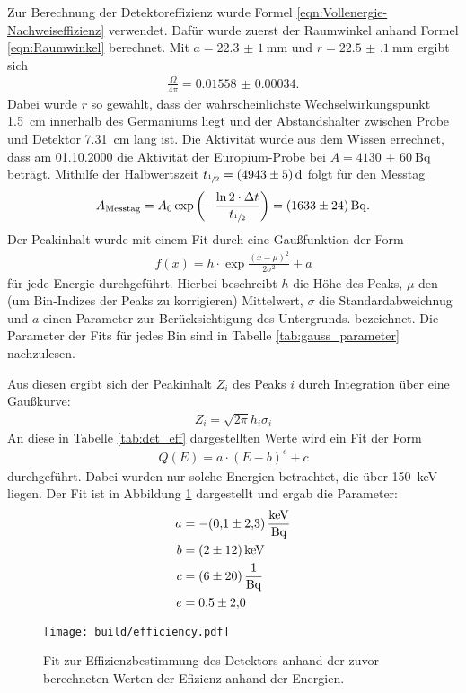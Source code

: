 Zur Berechnung der Detektoreffizienz wurde Formel
\eqref{eqn:Vollenergie-Nachweiseffizienz} verwendet. Dafür wurde zuerst der
Raumwinkel anhand Formel \eqref{eqn:Raumwinkel} berechnet. Mit
$a = \SI{22.3(10)}{\milli\meter}$ und $r = \SI{22.5(1)}{\milli\meter}$ ergibt sich
\begin{align*}
  \frac{\Omega}{4\pi} = \num{0.01558(34)}
	.
\end{align*}
Dabei wurde $r$ so gewählt, dass der wahrscheinlichste Wechselwirkungspunkt
\SI{1.5}{\centi\meter} innerhalb des Germaniums liegt und der Abstandshalter
zwischen Probe und Detektor \SI{7.31}{\centi\meter} lang ist.
Die Aktivität wurde aus dem Wissen errechnet, dass am 01.10.2000 die Aktivität
der Europium-Probe bei $A = \SI{4130(60)}{\becquerel}$ beträgt. Mithilfe der
Halbwertszeit $t_{\sfrac{1}{2}} = \SI{4943(5)}{\day}$ folgt für den Messtag
\begin{align*}
	A_\text{Messtag} = A_0 \exp\left(-\frac{\ln{2} \cdot\Delta t}{t_{\sfrac{1}{2}}}\right)=\SI{1633(24)}{\becquerel}
	.
\end{align*}
Der Peakinhalt wurde mit einem Fit durch eine Gaußfunktion der Form
\begin{align*}
	f\left(x\right) = h\cdot \exp{\frac{(x-\mu)^2}{2\sigma^2}} + a
\end{align*}
für jede Energie durchgeführt. Hierbei beschreibt $h$ die Höhe des Peaks, $\mu$
den (um Bin-Indizes der Peaks zu korrigieren) Mittelwert, $\sigma$ die
Standardabweichnug und $a$ einen Parameter zur Berücksichtigung des Untergrunds.
bezeichnet. Die Parameter der Fits für jedes Bin sind in Tabelle
\ref{tab:gauss_parameter} nachzulesen.

\FloatBarrier

Aus diesen ergibt sich der Peakinhalt $Z_i$ des Peaks $i$ durch Integration
über eine Gaußkurve:
\begin{align*}
  Z_i = \sqrt{2\pi} h_i \sigma_i
\end{align*}
An diese in Tabelle \ref{tab:det_eff} dargestellten Werte wird ein Fit der Form
\begin{align*}
  Q(E) = a \cdot (E - b)^e + c
\end{align*}
durchgeführt. Dabei wurden nur solche Energien betrachtet, die über
\SI{150}{\kilo\electronvolt} liegen.
Der Fit ist in Abbildung \ref{plt:eff} dargestellt und ergab die Parameter:
\begin{align*}
  a &= -\SI{0.1(23)}{\kilo\electronvolt\per\becquerel} \\
  b &= \SI{2(12)}{\kilo\electronvolt} \\
  c &= \SI{6(20)}{\raiseto{-1}\becquerel} \\
  e &= \num{0.5(20)}
\end{align*}
\begin{figure}[htb]
  \centering
  \texttt{[image: build/efficiency.pdf]}
  \caption{Fit zur Effizienzbestimmung des Detektors anhand der zuvor
  berechneten Werten der Efizienz anhand der Energien.}
  \label{plt:eff}
\end{figure}

